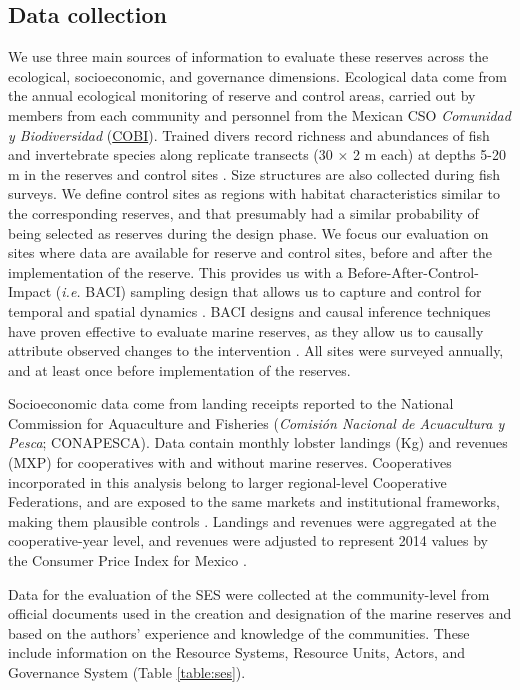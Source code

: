 \documentclass{frontiersSCNS}
\begin{document}
\hypertarget{data-collection}{%
\subsection{Data collection}\label{data-collection}}

We use three main sources of information to evaluate these reserves
across the ecological, socioeconomic, and governance dimensions.
Ecological data come from the annual ecological monitoring of reserve
and control areas, carried out by members from each community and
personnel from the Mexican CSO \emph{Comunidad y Biodiversidad}
(\href{www.cobi.org.mx}{COBI}). Trained divers record richness and
abundances of fish and invertebrate species along replicate transects
(30 \(\times\) 2 m each) at depths 5-20 m in the reserves and control
sites \citep{fulton_2018,fulton_2019,suman_2010-ez}. Size structures are
also collected during fish surveys. We define control sites as regions
with habitat characteristics similar to the corresponding reserves, and
that presumably had a similar probability of being selected as reserves
during the design phase. We focus our evaluation on sites where data are
available for reserve and control sites, before and after the
implementation of the reserve. This provides us with a
Before-After-Control-Impact (\emph{i.e.} BACI) sampling design that
allows us to capture and control for temporal and spatial dynamics
\citep{depalma_2018,ferraro_2006-oW}. BACI designs and causal inference
techniques have proven effective to evaluate marine reserves, as they
allow us to causally attribute observed changes to the intervention
\citep{moland_2013-VP,Villasenor-Derbez_2018}. All sites were surveyed
annually, and at least once before implementation of the reserves.

Socioeconomic data come from landing receipts reported to the National
Commission for Aquaculture and Fisheries (\emph{Comisión Nacional de
Acuacultura y Pesca}; CONAPESCA). Data contain monthly lobster landings
(Kg) and revenues (MXP) for cooperatives with and without marine
reserves. Cooperatives incorporated in this analysis belong to larger
regional-level Cooperative Federations, and are exposed to the same
markets and institutional frameworks, making them plausible controls
\citep{mccay_2017-1m,ayer_2018}. Landings and revenues were aggregated
at the cooperative-year level, and revenues were adjusted to represent
2014 values by the Consumer Price Index for Mexico \citep{oecd_2017-VV}.

Data for the evaluation of the SES were collected at the community-level
from official documents used in the creation and designation of the
marine reserves
\citep{dof_website_2012,dof_website_2013,dof_website_2018} and based on
the authors' experience and knowledge of the communities. These include
information on the Resource Systems, Resource Units, Actors, and
Governance System (Table \ref{table:ses}).
\end{document}
